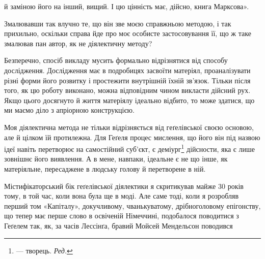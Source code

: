 \parcont{}  %
й заміною його на інший, вищий. І цю цінність має, дійсно,
книга Марксова».

Змалювавши так влучно те, що він зве моєю справжньою методою,
і так прихильно, оскільки справа йде про моє особисте
застосовування її, що ж таке змалював пан автор, як не діялектичну
методу?

Безперечно, спосіб викладу мусить формально відрізнятися
від способу дослідження. Дослідження має в подробицях засвоїти
матеріял, проаналізувати різні форми його розвитку і простежити
внутрішній їхній зв’язок. Тільки після того, як цю роботу виконано,
можна відповідним чином викласти дійсний рух. Якщо
цього досягнуто й життя матеріялу ідеально відбито, то може здатися,
що ми маємо діло з апріорною конструкцією.

Моя діялектична метода не тільки відрізняється від геґелівської
своєю основою, але й цілком їй протилежна. Для Геґеля процес
мислення, що його він під назвою ідеї навіть перетворює на самостійний
суб’єкт, є деміург\footnote*{
— творець. \emph{Ред.}
} дійсности, яка є лише зовнішнє його
виявлення. А в мене, навпаки, ідеальне є не що інше, як матеріяльне,
пересаджене в людську голову й перетворене в ній.

Містифікаторський бік геґелівської діялектики я скритикував майже
30 років тому, в той час, коли вона була ще в моді. Але саме
тоді, коли я розробляв перший том «Капіталу», докучливому,
чванькуватому, дрібноголовому епігонству, що тепер має перше
слово в освіченій Німеччині, подобалося поводитися з Геґелем
так, як, за часів Лессінґа, бравий Мойсей Мендельсон поводився
\parbreak{}  %
